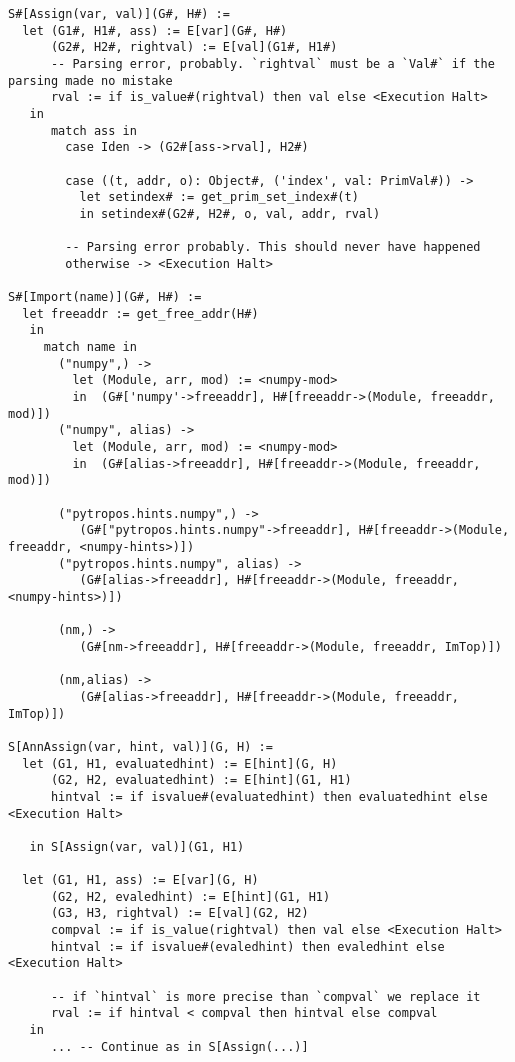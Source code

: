 \begin{verbatim}
S#[Assign(var, val)](G#, H#) :=
  let (G1#, H1#, ass) := E[var](G#, H#)
      (G2#, H2#, rightval) := E[val](G1#, H1#)
      -- Parsing error, probably. `rightval` must be a `Val#` if the parsing made no mistake
      rval := if is_value#(rightval) then val else <Execution Halt>
   in
      match ass in
        case Iden -> (G2#[ass->rval], H2#)

        case ((t, addr, o): Object#, ('index', val: PrimVal#)) ->
          let setindex# := get_prim_set_index#(t)
          in setindex#(G2#, H2#, o, val, addr, rval)

        -- Parsing error probably. This should never have happened
        otherwise -> <Execution Halt>

S#[Import(name)](G#, H#) :=
  let freeaddr := get_free_addr(H#)
   in
     match name in
       ("numpy",) ->
         let (Module, arr, mod) := <numpy-mod>
         in  (G#['numpy'->freeaddr], H#[freeaddr->(Module, freeaddr, mod)])
       ("numpy", alias) ->
         let (Module, arr, mod) := <numpy-mod>
         in  (G#[alias->freeaddr], H#[freeaddr->(Module, freeaddr, mod)])

       ("pytropos.hints.numpy",) ->
          (G#["pytropos.hints.numpy"->freeaddr], H#[freeaddr->(Module, freeaddr, <numpy-hints>)])
       ("pytropos.hints.numpy", alias) ->
          (G#[alias->freeaddr], H#[freeaddr->(Module, freeaddr, <numpy-hints>)])

       (nm,) ->
          (G#[nm->freeaddr], H#[freeaddr->(Module, freeaddr, ImTop)])

       (nm,alias) ->
          (G#[alias->freeaddr], H#[freeaddr->(Module, freeaddr, ImTop)])

S[AnnAssign(var, hint, val)](G, H) :=
  let (G1, H1, evaluatedhint) := E[hint](G, H)
      (G2, H2, evaluatedhint) := E[hint](G1, H1)
      hintval := if isvalue#(evaluatedhint) then evaluatedhint else <Execution Halt>

   in S[Assign(var, val)](G1, H1)

  let (G1, H1, ass) := E[var](G, H)
      (G2, H2, evaledhint) := E[hint](G1, H1)
      (G3, H3, rightval) := E[val](G2, H2)
      compval := if is_value(rightval) then val else <Execution Halt>
      hintval := if isvalue#(evaledhint) then evaledhint else <Execution Halt>

      -- if `hintval` is more precise than `compval` we replace it
      rval := if hintval < compval then hintval else compval
   in
      ... -- Continue as in S[Assign(...)]
\end{verbatim}

